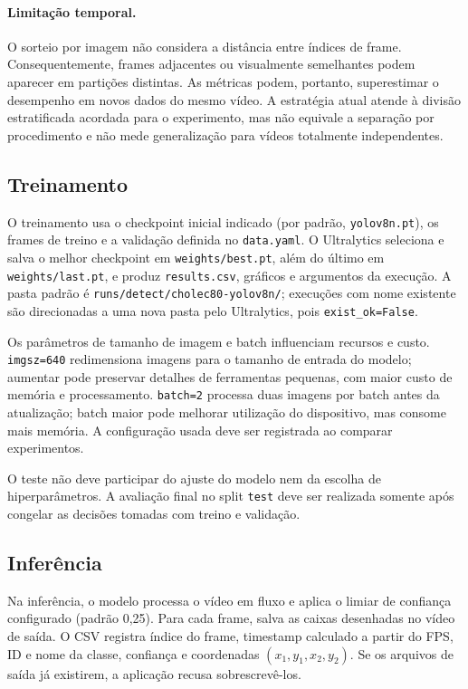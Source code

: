 \documentclass[12pt,a4paper]{article}
\begin{document}
\paragraph{Limitação temporal.} O sorteio por imagem não considera a distância entre índices de frame. Consequentemente, frames adjacentes ou visualmente semelhantes podem aparecer em partições distintas. As métricas podem, portanto, superestimar o desempenho em novos dados do mesmo vídeo. A estratégia atual atende à divisão estratificada acordada para o experimento, mas não equivale a separação por procedimento e não mede generalização para vídeos totalmente independentes.

\subsection{Treinamento}

O treinamento usa o checkpoint inicial indicado (por padrão, \texttt{yolov8n.pt}), os frames de treino e a validação definida no \texttt{data.yaml}. O Ultralytics seleciona e salva o melhor checkpoint em \texttt{weights/best.pt}, além do último em \texttt{weights/last.pt}, e produz \texttt{results.csv}, gráficos e argumentos da execução. A pasta padrão é \texttt{runs/detect/cholec80-yolov8n/}; execuções com nome existente são direcionadas a uma nova pasta pelo Ultralytics, pois \texttt{exist\_ok=False}.

Os parâmetros de tamanho de imagem e batch influenciam recursos e custo. \texttt{imgsz=640} redimensiona imagens para o tamanho de entrada do modelo; aumentar pode preservar detalhes de ferramentas pequenas, com maior custo de memória e processamento. \texttt{batch=2} processa duas imagens por batch antes da atualização; batch maior pode melhorar utilização do dispositivo, mas consome mais memória. A configuração usada deve ser registrada ao comparar experimentos.

O teste não deve participar do ajuste do modelo nem da escolha de hiperparâmetros. A avaliação final no split \texttt{test} deve ser realizada somente após congelar as decisões tomadas com treino e validação.

\subsection{Inferência}

Na inferência, o modelo processa o vídeo em fluxo e aplica o limiar de confiança configurado (padrão 0,25). Para cada frame, salva as caixas desenhadas no vídeo de saída. O CSV registra índice do frame, timestamp calculado a partir do FPS, ID e nome da classe, confiança e coordenadas \((x_1,y_1,x_2,y_2)\). Se os arquivos de saída já existirem, a aplicação recusa sobrescrevê-los.
\end{document}
